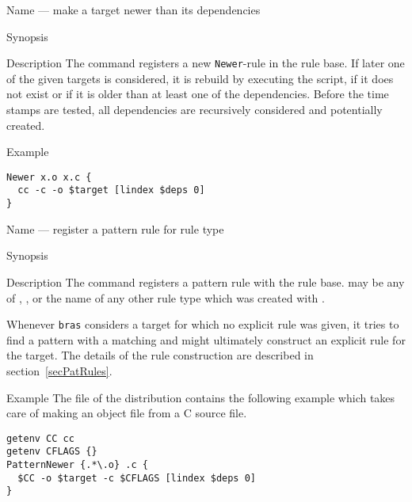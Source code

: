\documentclass[12pt]{article}
\newcommand{\bras}{\texttt{bras}}
\begin{document}
\begin{Describe}
\item[Name]  --- make a target newer than its dependencies
\item[Synopsis]    
\item[Description] The command registers a new \texttt{Newer}-rule in
  the rule base. If later one of the given targets is considered, it
  is rebuild by executing the script, if it does not exist or if it is
  older than at least one of the dependencies. Before the time stamps
  are tested, all dependencies are recursively considered and
  potentially created.
\item[Example]
\begin{verbatim}
Newer x.o x.c {
  cc -c -o $target [lindex $deps 0]
}
\end{verbatim}
\end{Describe}

\begin{Describe}
\item[Name]  --- register a pattern rule for rule
  type 
\item[Synopsis]    
\item[Description] The command registers a pattern rule with the rule
  base.  may be any of , ,  or
  the name of any other rule type which was created with .

  Whenever \bras{} considers a target for which no explicit rule
  was given, it tries to find a pattern with a matching  and
  might ultimately construct an explicit rule for the target. The
  details of the rule construction are described in
  section~\ref{secPatRules}. 
\item[Example] The file  of the distribution contains the
  following example which takes care of making an object file from a C
  source file.
\begin{verbatim}
getenv CC cc
getenv CFLAGS {}
PatternNewer {.*\.o} .c {
  $CC -o $target -c $CFLAGS [lindex $deps 0]
}
\end{verbatim}
\end{Describe}
\end{document}
